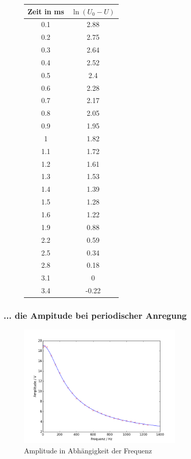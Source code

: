 \begin{figure}[h!]
	\centering
	\begin{tabular}{c|c}
		Zeit in \si{\milli\second}& $\ln(U_0-U)$ \\
		\hline
		0.1 &  2.88 \\
		0.2 &  2.75 \\
		0.3 &  2.64 \\
		0.4 &  2.52 \\
		0.5 &  2.4  \\
		0.6 &  2.28 \\
		0.7 &  2.17 \\
		0.8 &  2.05 \\
		0.9 &  1.95 \\
		1   &  1.82 \\
		1.1 &  1.72 \\
		1.2 &  1.61 \\
		1.3 &  1.53 \\
		1.4 &  1.39 \\
		1.5 &  1.28 \\
		1.6 &  1.22 \\
		1.9 &  0.88 \\
		2.2 &  0.59 \\
		2.5 &  0.34 \\
		2.8 &  0.18 \\
		3.1 &  0    \\
		3.4 & -0.22 \\
	\end{tabular}
	\label{tab:aufladekurve}
\end{figure}



\clearpage
\subsubsection{... die Ampitude bei periodischer Anregung}
\begin{figure}[h!]
\centering
\includegraphics[width=0.7\textwidth]{Amplitude.png}
\caption{Amplitude in Abhängigkeit der Frequenz}
\label{fig:amplitude}
\end{figure} 
